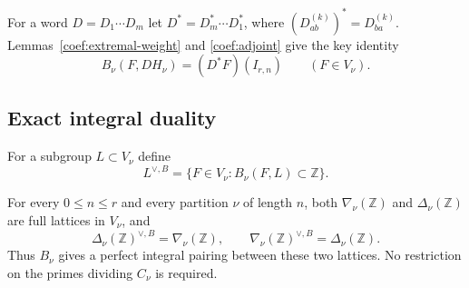 For a word $D=D_1\cdots D_m$ let
$D^*=D_m^*\cdots D_1^*$, where
$(D_{ab}^{(k)})^*=D_{ba}^{(k)}$.
Lemmas~\ref{coef:extremal-weight} and \ref{coef:adjoint} give the
key identity
\begin{equation}\label{coef:word-evaluation}
                 B_\nu(F,DH_\nu)=(D^*F)(I_{r,n})
                       \qquad(F\in V_\nu).
\end{equation}

\subsection{Exact integral duality}

For a subgroup $L\subset V_\nu$ define
\[
 L^{\vee,B}=\{F\in V_\nu:B_\nu(F,L)\subset\mathbb Z\}.
\]

\begin{theorem}\label{coef:integral-duality}
For every $0\le n\le r$ and every partition $\nu$ of length $n$,
both $\nabla_\nu(\mathbb Z)$ and $\Delta_\nu(\mathbb Z)$ are full
lattices in $V_\nu$, and
\begin{equation}\label{coef:duality}
 \Delta_\nu(\mathbb Z)^{\vee,B}=\nabla_\nu(\mathbb Z),
 \qquad
 \nabla_\nu(\mathbb Z)^{\vee,B}=\Delta_\nu(\mathbb Z).
\end{equation}
Thus $B_\nu$ gives a perfect integral pairing between these two
lattices. No restriction on the primes dividing $C_\nu$ is required.
\end{theorem}
